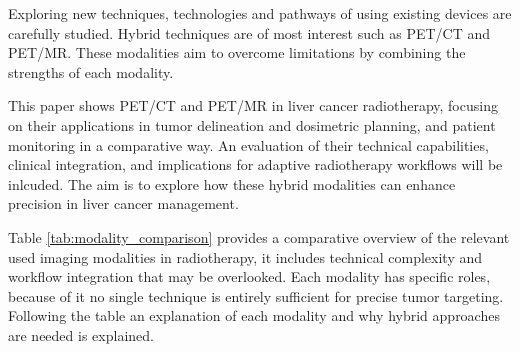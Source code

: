 \documentclass[11pt]{article} %
\begin{document}
\begin{multicols}{2}
Exploring new techniques, technologies and pathways of using existing devices are carefully studied. Hybrid techniques are of most interest such as PET/CT and PET/MR. These modalities aim to overcome limitations by combining the strengths of each modality.

This paper shows PET/CT and PET/MR in liver cancer radiotherapy, focusing on their applications in tumor delineation and dosimetric planning, and patient monitoring in a comparative way. An evaluation of their technical capabilities, clinical integration, and implications for adaptive radiotherapy workflows will be inlcuded. The aim is to explore how these hybrid modalities can enhance precision in liver cancer management. 

Table \ref{tab:modality_comparison} provides a comparative overview of the relevant used imaging modalities in radiotherapy, it includes technical complexity and workflow integration that may be overlooked. Each modality has specific roles, because of it no single technique is entirely sufficient for precise tumor targeting. Following the table an explanation of each modality and why hybrid approaches are needed is explained.

\end{multicols}
\end{document}

